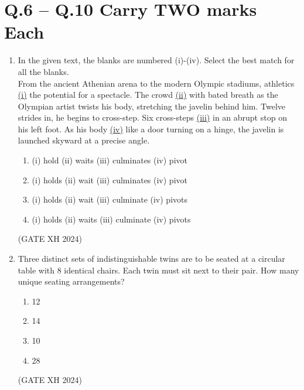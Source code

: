 \documentclass{article}
\begin{document}
\section*{Q.6 – Q.10 Carry TWO marks Each}
\begin{enumerate}
    \item In the given text, the blanks are numbered (i)-(iv). Select the best match for all the blanks. \\ 
    From the ancient Athenian arena to the modern Olympic stadiums, athletics \underline{\hspace{0.3cm}(i)\hspace{0.3cm}} the potential for a spectacle. The crowd \underline{\hspace{0.3cm}(ii)\hspace{0.3cm}} with bated breath as the Olympian artist twists his body, stretching the javelin behind him. Twelve strides in, he begins to cross-step. Six cross-steps \underline{\hspace{0.3cm}(iii)\hspace{0.3cm}} in an abrupt stop on his left foot. As his body \underline{\hspace{0.3cm}(iv)\hspace{0.3cm}} like a door turning on a hinge, the javelin is launched skyward at a precise angle.

    \begin{multicols}{2}
    \begin{enumerate}
        \item (i) hold (ii) waits (iii) culminates (iv) pivot 
        \item (i) holds (ii) wait (iii) culminates (iv) pivot 
        \item (i) holds (ii) wait (iii) culminate (iv) pivots 
        \item (i) holds (ii) waits (iii) culminate (iv) pivots
    \end{enumerate}
    \end{multicols} \hfill (GATE XH 2024)

    \item Three distinct sets of indistinguishable twins are to be seated at a circular table with 8 identical chairs. Each twin must sit next to their pair. How many unique seating arrangements?
    
    \begin{multicols}{4}
        \begin{enumerate}
            \item 12
            \item 14
            \item 10
            \item 28
        \end{enumerate}
    \end{multicols} \hfill (GATE XH 2024)


\end{enumerate}
\end{document}
